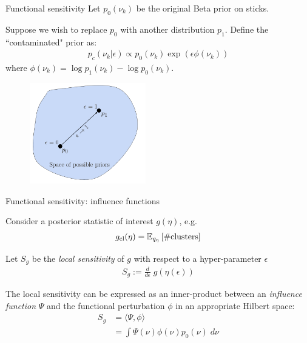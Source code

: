 \begin{frame}{Functional sensitivity}
Let $p_0(\nu_k)$ be the original Beta prior on sticks.

Suppose we wish to replace $p_0$ with another distribution $p_1$. Define the ``contaminated" prior as:
\begin{align*}
p_c(\nu_k \vert \epsilon) \propto
p_{0}(\nu_k)\exp(\epsilon\phi(\nu_k))
\end{align*}
where $\phi(\nu_k) = \log p_1(\nu_k) - \log p_0(\nu_k)$.

\begin{figure}[!h]
\centering
\includegraphics[width = 0.45\textwidth]{./figures/static_figures/functional_perturbation.png}
\setlength{\textfloatsep}{-10pt}
\end{figure}

\end{frame}

\begin{frame}{Functional sensitivity: influence functions}

Consider a posterior statistic of interest $g(\eta)$, e.g.
\begin{align*}
g_{\textrm{cl}}(\eta) = \mathbb{E}_{q_{\eta}} \left[ \#\text{clusters} \right]
\end{align*}

Let $S_g$ be the \textit{local sensitivity} of $g$ with respect to a hyper-parameter $\epsilon$
\begin{align*}
S_g := \frac{d}{d\epsilon} \; g(\eta(\epsilon))
\end{align*}

\pause

The local sensitivity can be expressed as an inner-product between an \textit{influence function} $\Psi$
and the functional perturbation $\phi$ in an appropriate Hilbert space:
\begin{align*}
S_g &= \langle \Psi, \phi\rangle \\
&= \int \Psi(\nu) \phi(\nu) p_0(\nu) \;d\nu
\end{align*}


\end{frame}

